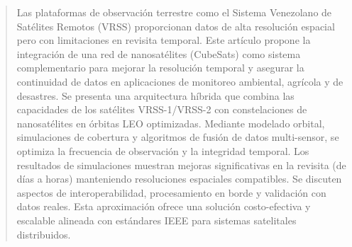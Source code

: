 \begin{abstract}
Las plataformas de observación terrestre como el Sistema Venezolano de Satélites Remotos (VRSS) proporcionan datos de alta resolución espacial pero con limitaciones en revisita temporal. Este artículo propone la integración de una red de nanosatélites (CubeSats) como sistema complementario para mejorar la resolución temporal y asegurar la continuidad de datos en aplicaciones de monitoreo ambiental, agrícola y de desastres. Se presenta una arquitectura híbrida que combina las capacidades de los satélites VRSS-1/VRSS-2 con constelaciones de nanosatélites en órbitas LEO optimizadas. Mediante modelado orbital, simulaciones de cobertura y algoritmos de fusión de datos multi-sensor, se optimiza la frecuencia de observación y la integridad temporal. Los resultados de simulaciones muestran mejoras significativas en la revisita (de días a horas) manteniendo resoluciones espaciales compatibles. Se discuten aspectos de interoperabilidad, procesamiento en borde y validación con datos reales. Esta aproximación ofrece una solución costo-efectiva y escalable alineada con estándares IEEE para sistemas satelitales distribuidos.
\end{abstract}